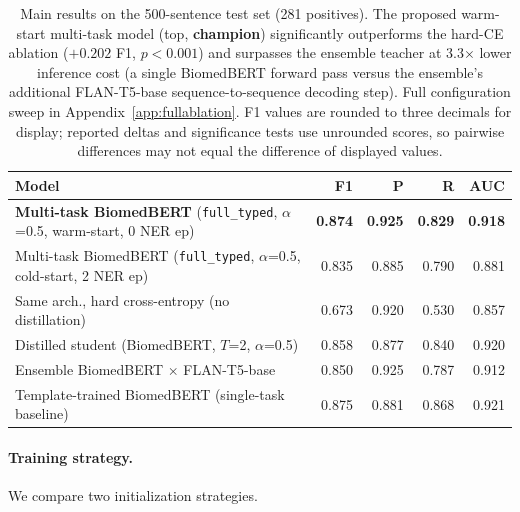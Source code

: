 \documentclass[11pt]{article}
\begin{document}
\begin{table}[!t]
\centering
\small
\caption{Main results on the 500-sentence test set (281 positives).
The proposed warm-start multi-task model (top, \textbf{champion}) significantly outperforms the
hard-CE ablation ($+0.202$ F1, $p{<}0.001$) and surpasses the ensemble teacher
at 3.3$\times$ lower inference cost (a single BiomedBERT forward pass versus
the ensemble's additional FLAN-T5-base sequence-to-sequence decoding step).
Full configuration sweep in Appendix~\ref{app:fullablation}. F1 values are
rounded to three decimals for display; reported deltas and significance
tests use unrounded scores, so pairwise differences may not equal the
difference of displayed values.}
\label{tab:main_results}
\begin{tabular}{lrrrr}
\toprule
\textbf{Model} & \textbf{F1} & \textbf{P} & \textbf{R} & \textbf{AUC} \\
\midrule
\rowcolor{bestrow}
\textbf{Multi-task BiomedBERT} (\texttt{full\_typed}, $\alpha$=0.5, warm-start, 0 NER ep) & \textbf{0.874} & \textbf{0.925} & \textbf{0.829} & \textbf{0.918} \\
\midrule
\rowcolor{greyrow}
Multi-task BiomedBERT (\texttt{full\_typed}, $\alpha$=0.5, cold-start, 2 NER ep) & 0.835 & 0.885 & 0.790 & 0.881 \\
\rowcolor{greyrow}
Same arch., hard cross-entropy (no distillation)    & 0.673 & 0.920 & 0.530 & 0.857 \\
\rowcolor{greyrow}
Distilled student (BiomedBERT, $T$=2, $\alpha$=0.5) & 0.858 & 0.877 & 0.840 & 0.920 \\
\rowcolor{greyrow}
Ensemble BiomedBERT $\times$ FLAN-T5-base           & 0.850 & 0.925 & 0.787 & 0.912 \\
\rowcolor{greyrow}
Template-trained BiomedBERT (single-task baseline)  & 0.875 & 0.881 & 0.868 & 0.921 \\
\bottomrule
\end{tabular}
\end{table}

\paragraph{Training strategy.}
We compare two initialization strategies.
\end{document}
